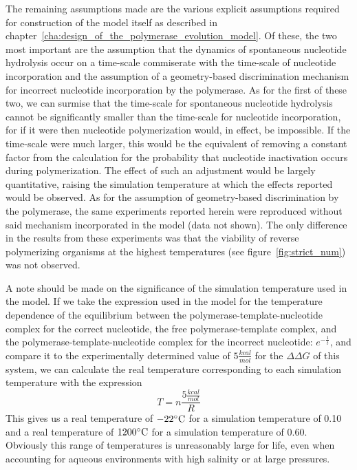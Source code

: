 The remaining assumptions made are the various explicit assumptions required for construction of the model itself as described in chapter~\ref{cha:design_of_the_polymerase_evolution_model}. Of these, the two most important are the assumption that the dynamics of spontaneous nucleotide hydrolysis occur on a time-scale commiserate with the time-scale of nucleotide incorporation and the assumption of a geometry-based discrimination mechanism for incorrect nucleotide incorporation by the polymerase. As for the first of these two, we can surmise that the time-scale for spontaneous nucleotide hydrolysis cannot be significantly smaller than the time-scale for nucleotide incorporation, for if it were then nucleotide polymerization would, in effect, be impossible. If the time-scale were much larger, this would be the equivalent of removing a constant factor from the calculation for the probability that nucleotide inactivation occurs during polymerization. The effect of such an adjustment would be largely quantitative, raising the simulation temperature at which the effects reported would be observed. As for the assumption of geometry-based discrimination by the polymerase, the same experiments reported herein were reproduced without said mechanism incorporated in the model (data not shown). The only difference in the results from these experiments was that the viability of reverse polymerizing organisms at the highest temperatures (see figure~\ref{fig:strict_num}) was not observed.

A note should be made on the significance of the simulation temperature used in the model. If we take the expression used in the model for the temperature dependence of the equilibrium between the polymerase-template-nucleotide complex for the correct nucleotide, the free polymerase-template complex, and the polymerase-template-nucleotide complex for the incorrect nucleotide: $e^{-\frac{1}{t}}$, and compare it to the experimentally determined value of $5 \frac{kcal}{mol}$ for the $\Delta\Delta G$ of this system, we can calculate the real temperature corresponding to each simulation temperature with the expression\[
	T = n \frac{5\frac{kcal}{mol}}{R}
\]
This gives us a real temperature of $-22^\circ \rm{C}$ for a simulation temperature of 0.10 and a real temperature of $1200^\circ \rm{C}$ for a simulation temperature of 0.60. Obviously this range of temperatures is unreasonably large for life, even when accounting for aqueous environments with high salinity or at large pressures.

